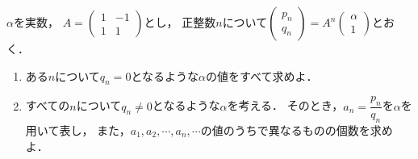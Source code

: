 \documentclass[../../main.tex]{subfiles}
\begin{document}
$\alpha$を実数，
$A=
\begin{pmatrix} 1 & -1 \\ 1 & 1
\end{pmatrix}$とし，
正整数$n$について$
\begin{pmatrix} p_n \\ q_n
\end{pmatrix}=A^n
\begin{pmatrix} \alpha \\ 1
\end{pmatrix}$とおく．
\begin{enumerate}
  \item ある$n$について$q_n=0$となるような$\alpha$の値をすべて求めよ．
  \item すべての$n$について$q_n \neq 0$となるような$\alpha$を考える．
    そのとき，$\displaystyle a_n=\dfrac{p_n}{q_n}$を$\alpha$を用いて表し，
    また，$a_1,a_2,\cdots,a_n,\cdots$の値のうちで異なるものの個数を求めよ．
\end{enumerate}
\end{document}
